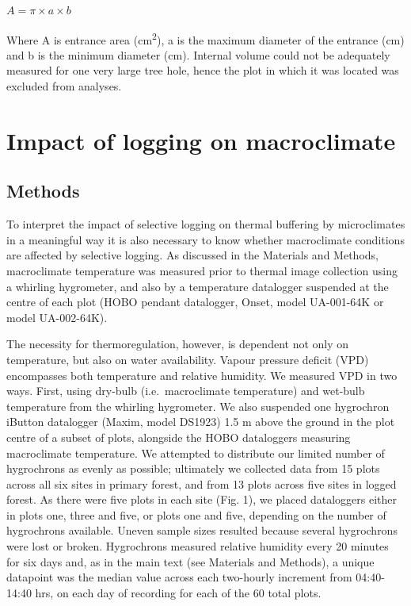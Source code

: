 \documentclass[12pt,a4paper,]{report}
\theoremstyle{definition}
\theoremstyle{definition}
\theoremstyle{definition}
\theoremstyle{remark}
\begin{document}
\begin{center}
$A = \pi \times a \times b$
\end{center}

Where A is entrance area (cm\textsuperscript{2}), a is the maximum
diameter of the entrance (cm) and b is the minimum diameter (cm).
Internal volume could not be adequately measured for one very large tree
hole, hence the plot in which it was located was excluded from analyses.

\pagebreak

\section{Impact of logging on macroclimate}\label{text-B-4}

\subsection{Methods}\label{methods-4}

To interpret the impact of selective logging on thermal buffering by
microclimates in a meaningful way it is also necessary to know whether
macroclimate conditions are affected by selective logging. As discussed
in the Materials and Methods, macroclimate temperature was measured
prior to thermal image collection using a whirling hygrometer, and also
by a temperature datalogger suspended at the centre of each plot (HOBO
pendant datalogger, Onset, model UA-001-64K or model UA-002-64K).

The necessity for thermoregulation, however, is dependent not only on
temperature, but also on water availability. Vapour pressure deficit
(VPD) encompasses both temperature and relative humidity. We measured
VPD in two ways. First, using dry-bulb (i.e.~macroclimate temperature)
and wet-bulb temperature from the whirling hygrometer. We also suspended
one hygrochron iButton datalogger (Maxim, model DS1923) 1.5 m above the
ground in the plot centre of a subset of plots, alongside the HOBO
dataloggers measuring macroclimate temperature. We attempted to
distribute our limited number of hygrochrons as evenly as possible;
ultimately we collected data from 15 plots across all six sites in
primary forest, and from 13 plots across five sites in logged forest. As
there were five plots in each site (Fig. 1), we placed dataloggers
either in plots one, three and five, or plots one and five, depending on
the number of hygrochrons available. Uneven sample sizes resulted
because several hygrochrons were lost or broken. Hygrochrons measured
relative humidity every 20 minutes for six days and, as in the main text
(see Materials and Methods), a unique datapoint was the median value
across each two-hourly increment from 04:40-14:40 hrs, on each day of
recording for each of the 60 total plots.
\end{document}
